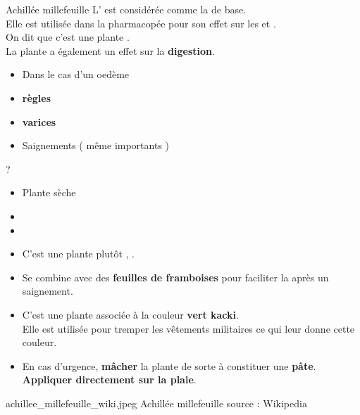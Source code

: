 \ficheidentiteplante
{Achillée millefeuille}
{%
    L' est considérée comme la  de base.\\ 
    Elle est utilisée dans la pharmacopée pour son effet sur les  et .\\
    On dit que c'est une plante .\\

    La plante a également un effet sur la \textbf{digestion}.
}
{%
    \begin{itemize}[label = \bcplume]
        \item Dans le cas d'un oedème
        \item \textbf{règles}
        \item \textbf{varices}
        \item Saignements ( même importants )
    \end{itemize}
}
{%
    ?
}
{%
    \begin{itemize}[label = \bccrayon]
        \item Plante sèche
        \item {}
        \item {}
    \end{itemize}
}
{%
    \begin{itemize}[label = \bcplume]
        \item C'est une plante plutôt , .
        \item Se combine avec des \textbf{feuilles de framboises} pour faciliter la  après un saignement.
        \item C'est une plante  associée à la couleur \textbf{vert kacki}.\\Elle est utilisée pour tremper les vêtements militaires ce qui leur donne cette couleur. 
        \item[\bcattention] En cas d'urgence, \textbf{mâcher} la plante de sorte à constituer une \textbf{pâte}.\\ \textbf{Appliquer directement sur la plaie}.
    \end{itemize}
}
{%
    achillee_millefeuille_wiki.jpeg
}
{%
    Achillée millefeuille
}
{%
    source : Wikipedia 
}
